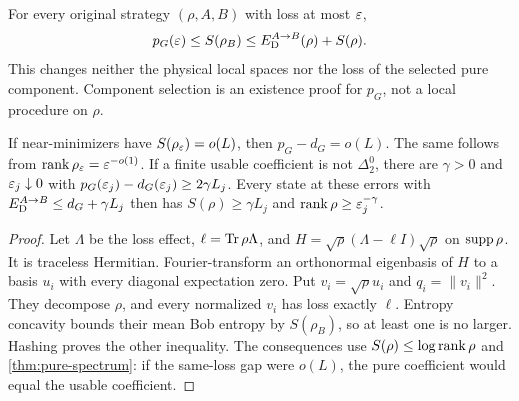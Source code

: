 \begin{proposition}\label{prop:equal-loss-ensemble}
For every original strategy $(\rho,A,B)$ with loss at most $\varepsilon$,
\[
 p_G(\varepsilon)\le S(\rho_B)\le E_{\mathrm D}^{A\to B}(\rho)+S(\rho).
\]
This changes neither the physical local spaces nor the loss of the selected pure component. Component selection is an existence proof for $p_G$, not a local procedure on $\rho$.

If near-minimizers have $S(\rho_\varepsilon)=o(L)$, then $p_G-d_G=o(L)$. The same follows from $\operatorname{rank}\rho_\varepsilon=\varepsilon^{-o(1)}$. If a finite usable coefficient is not $\Delta^0_2$, there are $\gamma>0$ and $\varepsilon_j\downarrow0$ with $p_G(\varepsilon_j)-d_G(\varepsilon_j)\ge2\gamma L_j$. Every state at these errors with $E_{\mathrm D}^{A\to B}\le d_G+\gamma L_j$ then has $S(\rho)\ge\gamma L_j$ and $\operatorname{rank}\rho\ge\varepsilon_j^{-\gamma}$.
\end{proposition}
\begin{proof}
Let $\Lambda$ be the loss effect, $\ell=\operatorname{Tr}\rho\Lambda$, and $H=\sqrt\rho(\Lambda-\ell I)\sqrt\rho$ on $\operatorname{supp}\rho$. It is traceless Hermitian. Fourier-transform an orthonormal eigenbasis of $H$ to a basis $u_i$ with every diagonal expectation zero. Put $v_i=\sqrt\rho u_i$ and $q_i=\|v_i\|^2$. They decompose $\rho$, and every normalized $v_i$ has loss exactly $\ell$. Entropy concavity bounds their mean Bob entropy by $S(\rho_B)$, so at least one is no larger. Hashing proves the other inequality. The consequences use $S(\rho)\le\log\operatorname{rank}\rho$ and \cref{thm:pure-spectrum}: if the same-loss gap were $o(L)$, the pure coefficient would equal the usable coefficient.
\end{proof}

